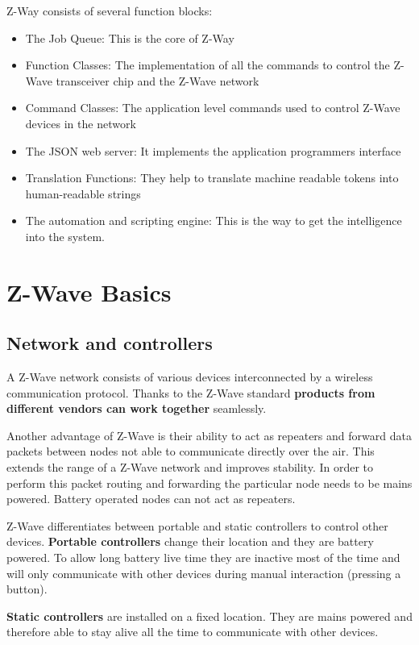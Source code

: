 Z-Way consists of several function blocks:

\begin{itemize}
\item The Job Queue: This is the core of Z-Way
\item Function Classes: The implementation of all the commands to control the Z-Wave transceiver chip and the Z-Wave network
\item Command Classes: The application level commands used to control Z-Wave devices in the network
\item The JSON web server: It implements the application programmers interface
\item Translation Functions: They help to translate machine readable tokens into human-readable strings
\item The automation and scripting engine: This is the way to get the intelligence into the system.
\end{itemize}

 

\section{Z-Wave Basics}

\subsection{Network and controllers}

A Z-Wave network consists of various devices interconnected by a wireless communication protocol. Thanks to the Z-Wave standard 
{\bf products from different vendors can work together} seamlessly. 

Another advantage of Z-Wave is their ability to act as repeaters and forward data packets between nodes not able to communicate 
directly over the air. This extends the range of a Z-Wave network and improves stability. In order to perform this packet routing and 
forwarding the particular node needs to be mains powered. Battery operated nodes can not act as repeaters.

Z-Wave differentiates between portable and static controllers to control other devices. {\bf Portable controllers }change their location and 
they are battery powered. To allow long battery live time they are inactive most of the time and will only communicate with other 
devices during manual interaction (pressing a button). 

{\bf Static controllers} are installed on a fixed location. They are mains powered and therefore able to stay alive all the time to communicate 
with other devices. 

